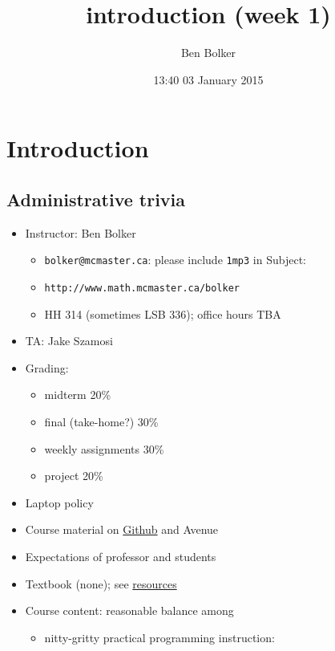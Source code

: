 \documentclass[]{tufte-handout}
\title{introduction (week 1)}
\author{Ben Bolker}
\date{13:40 03 January 2015}
\begin{document}
\maketitle

\section{Introduction}\label{introduction}

\subsection{Administrative trivia}\label{administrative-trivia}

\begin{itemize}
\itemsep1pt\parskip0pt
\item
  Instructor: Ben Bolker

  \begin{itemize}
  \itemsep1pt\parskip0pt
  \item
    \texttt{bolker@mcmaster.ca}: please include \texttt{1mp3} in
    Subject:
  \item
    \texttt{http://www.math.mcmaster.ca/bolker}
  \item
    HH 314 (sometimes LSB 336); office hours TBA
  \end{itemize}
\item
  TA: Jake Szamosi
\item
  Grading:

  \begin{itemize}
  \itemsep1pt\parskip0pt
  \item
    midterm 20\%
  \item
    final (take-home?) 30\%
  \item
    weekly assignments 30\%
  \item
    project 20\%
  \end{itemize}
\item
  Laptop policy
\item
  Course material on \href{https://github.com/bbolker/math1mp}{Github}
  and Avenue
\item
  Expectations of professor and students
\item
  Textbook (none); see
  \href{https://github.com/bbolker/math1mp/misc/resources.md}{resources}
\item
  Course content: reasonable balance among

  \begin{itemize}
  \itemsep1pt\parskip0pt
  \item
    nitty-gritty practical programming instruction:
  \end{itemize}
\end{itemize}
\end{document}

